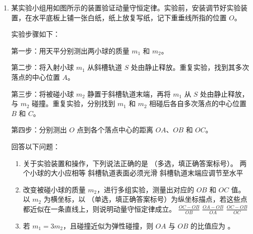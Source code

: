 \documentclass[\gkver]{gaokaozhenti}
\begin{document}
\begin{enumerate}
{D．若向上平移挡板，由于 $L$、$d$ 不变，根据 $\Delta x = \frac{L}{d}\lambda$ 可知，条纹间距不变，故 D 正确。

故选 ACD。
}

\item
某实验小组用如图所示的装置验证动量守恒定律。实验前，安装调节好实验装置，在水平底板上铺一张白纸，纸上放复写纸，记下重垂线所指的位置 $O$。

实验步骤如下：

第一步：用天平分别测出两小球的质量 $m_{1}$ 和 $m_{2}$。

第二步：将入射小球 $m_{1}$ 从斜槽轨道 $S$ 处由静止释放。重复实验，找到其多次落点的中心位置 $A$。

第三步：将被碰小球 $m_{2}$ 静置于斜槽轨道末端，再将 $m_{1}$ 从 $S$ 处由静止释放，与 $m_{2}$ 碰撞。重复实验，分别找到 $m_{1}$ 和 $m_{2}$ 相碰后各自多次落点的中心位置 $B$ 和 $C$。

第四步：分别测出 $O$ 点到各个落点中心的距离 $OA$、$OB$ 和 $OC$。

回答以下问题：
\begin{enumerate}
	\item
	关于实验装置和操作，下列说法正确的是 （多选，填正确答案标号）。
	{两个小球的大小应相等}
	{斜槽轨道表面必须光滑}
	{斜槽轨道末端应调节至水平}
	\item
	改变被碰小球的质量 $m_{2}$，进行多组实验，测量出对应的 $OB$ 和 $OC$ 值。以 $m_{2}$ 为横坐标，以 （单选，填正确答案标号）为纵坐标描点，若这些点都近似在一条直线上，则说明动量守恒定律成立。
	{$\frac{OC - OB}{OB}$}
	{$\frac{OA - OB}{OA}$}
	{$\frac{OC - OB}{OC}$}
	\item
	若 $m_{1} = 3m_{2}$，且碰撞近似为弹性碰撞，则 $OA$ 与 $OB$ 的比值应为 。
\end{enumerate}

\end{enumerate}
\end{document}
